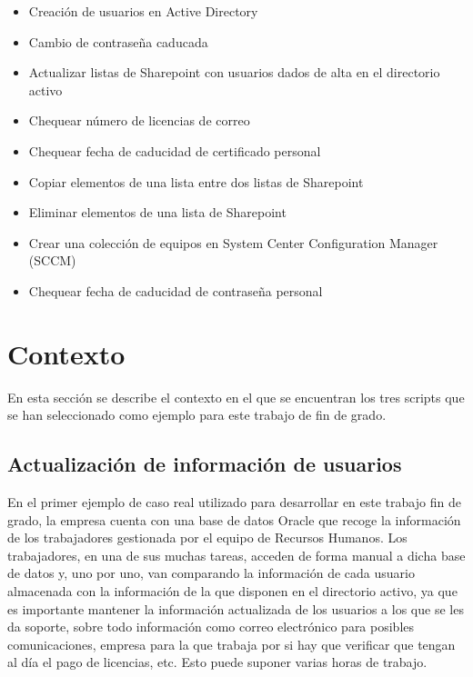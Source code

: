 \documentclass[a4paper, 12pt]{book}
\begin{document}
\begin{itemize}
\item Creación de usuarios en Active Directory

\item Cambio de contraseña caducada

\item Actualizar listas de Sharepoint con usuarios dados de alta en el directorio activo

\item Chequear número de licencias de correo

\item Chequear fecha de caducidad de certificado personal

\item Copiar elementos de una lista entre dos listas de Sharepoint

\item Eliminar elementos de una lista de Sharepoint

\item Crear una colección de equipos en System Center Configuration Manager (SCCM)

\item Chequear fecha de caducidad de contraseña personal
\end{itemize}


\section{Contexto}
\label{sec:contexto}

En esta sección se describe el contexto en el que se encuentran los tres scripts que se han seleccionado como ejemplo para este trabajo de fin de grado.

\subsection{Actualización de información de usuarios}
\label{subsec:Actualización de información de usuarios}

En el primer ejemplo de caso real utilizado para desarrollar en este trabajo fin de grado, la empresa cuenta con una base de datos Oracle que recoge la información de los trabajadores gestionada por el equipo de Recursos Humanos. Los trabajadores, en una de sus muchas tareas, acceden de forma manual a dicha base de datos y, uno por uno, van comparando la información de cada usuario almacenada con la información de la que disponen en el directorio activo, ya que es importante mantener la información actualizada de los usuarios a los que se les da soporte, sobre todo información como correo electrónico para posibles comunicaciones, empresa para la que trabaja por si hay que verificar que tengan al día el pago de licencias, etc. Esto puede suponer varias horas de trabajo.
\\
\end{document}
